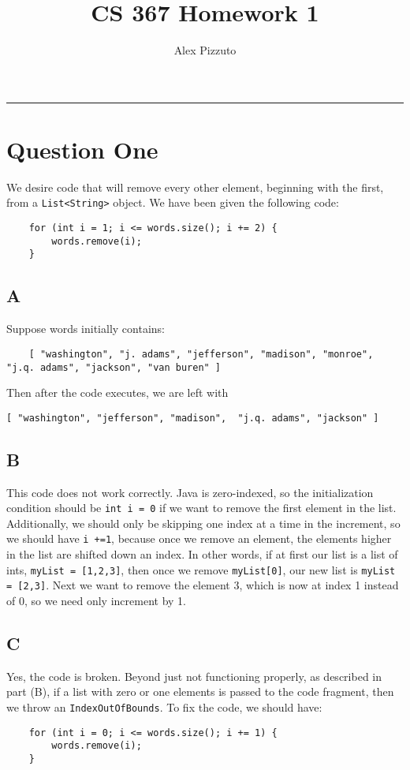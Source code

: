 \documentclass[11pt,letterpaper]{article}
\author{Alex Pizzuto}
\title{CS 367 Homework 1}
\begin{document}
\date{}
\maketitle
\hrule

\section{Question One}
We desire code that will remove every other element, beginning with the first, from a \texttt{List<String>} object. We have been given the following code: 

\begin{lstlisting}
	for (int i = 1; i <= words.size(); i += 2) {
	    words.remove(i); 
	}
\end{lstlisting}
\subsection*{A}
Suppose words initially contains:
\begin{lstlisting}
	[ "washington", "j. adams", "jefferson", "madison", "monroe", "j.q. adams", "jackson", "van buren" ]
\end{lstlisting}
Then after the code executes, we are left with 
\begin{lstlisting}
[ "washington", "jefferson", "madison",  "j.q. adams", "jackson" ]
\end{lstlisting}

\subsection*{B}
This code does not work correctly. Java is zero-indexed, so the initialization condition should be \texttt{int i = 0} if we want to remove the first element in the list. Additionally, we should only be skipping one index at a time in the increment, so we should have \texttt{i +=1}, because once we remove an element, the elements higher in the list are shifted down an index. In other words, if at first our list is a list of ints, \texttt{myList = [1,2,3]}, then once we remove \texttt{myList[0]}, our new list is \texttt{myList = [2,3]}. Next we want to remove the element 3, which is now at index 1 instead of 0, so we need only increment by 1.

\subsection*{C}
Yes, the code is broken. Beyond just not functioning properly, as described in part (B), if a list with zero or one elements is passed to the code fragment, then we throw an \texttt{IndexOutOfBounds}. To fix the code, we should have: 
\begin{lstlisting}
	for (int i = 0; i <= words.size(); i += 1) {
	    words.remove(i); 
	}
\end{lstlisting}
\end{document}
